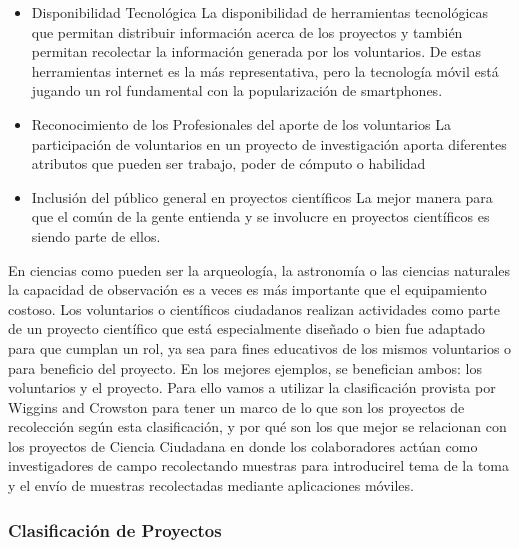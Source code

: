 \begin{itemize}
	\item {Disponibilidad Tecnológica}
	La disponibilidad de herramientas tecnológicas que permitan distribuir información acerca de los proyectos y también permitan recolectar la información generada por los voluntarios. De estas herramientas internet es la más representativa, pero la tecnología móvil está jugando un rol fundamental con la popularización de smartphones. \cite{silvertown2009new}
	\item {Reconocimiento de los Profesionales del aporte de los voluntarios}
	La participación de voluntarios en un proyecto de investigación aporta diferentes atributos que pueden ser trabajo, poder de cómputo o habilidad \cite{cohn2008citizen}
	\item {Inclusión del público general en proyectos científicos}
	La mejor manera para que el común de la gente entienda y se involucre en proyectos científicos es siendo parte de ellos. \cite{silvertown2009new}
\end{itemize} 

	En ciencias como pueden ser la arqueología, la astronomía o las ciencias naturales la capacidad de observación es a veces es más importante que el equipamiento costoso. Los voluntarios o científicos ciudadanos realizan actividades como parte de un proyecto científico que está especialmente diseñado o bien fue adaptado para que cumplan un rol, ya sea para fines educativos de los mismos voluntarios o para beneficio del proyecto. En los mejores ejemplos, se benefician ambos: los voluntarios y el proyecto.\cite{silvertown2009new}
	Para ello vamos a utilizar la clasificación provista por Wiggins and Crowston para tener un marco de lo que son los proyectos de recolección según esta clasificación, y por qué son los que mejor se relacionan con los proyectos de Ciencia Ciudadana en donde los colaboradores actúan como investigadores de campo recolectando muestras para introducirel tema de la toma y el envío de muestras recolectadas mediante aplicaciones móviles.	

\subsubsection{Clasificación de Proyectos}	

